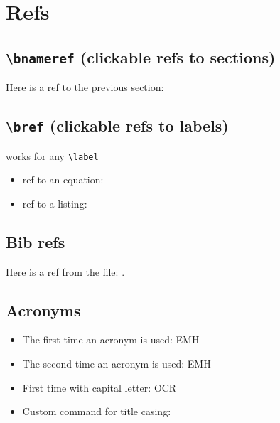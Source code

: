 \section{Refs}

\subsection{\texttt{{\normalfont \textbackslash}bnameref} (clickable refs to sections)}
Here is a ref to the previous section:

\subsection{\texttt{{\normalfont \textbackslash}bref} (clickable refs to labels)}

{}
works for any
\texttt{{\normalfont \textbackslash}label}

\begin{itemize}
    \item ref to an equation: 
    \item ref to a listing: 
\end{itemize}

\subsection{Bib refs}

Here is a ref from the  file: \textcite{Guilhoto2018}.

\subsection{Acronyms}


\begin{itemize}
    \item The first time an acronym is used: \gls{EMH}
    \item The second time an acronym is used: \gls{EMH}
    \item First time with capital letter: \Gls{OCR}
    \item Custom command for title casing: 
\end{itemize}

